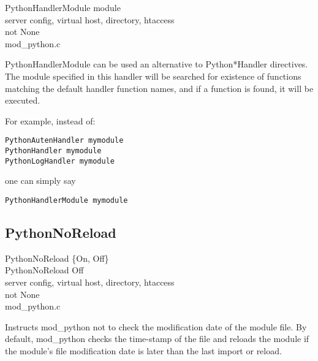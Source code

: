 PythonHandlerModule module \\
server config, virtual host, directory, htaccess\\
not None\\
mod_python.c

PythonHandlerModule can be used an alternative to Python*Handler
directives. The module specified in this handler will be searched for
existence of functions matching the default handler function names,
and if a function is found, it will be executed.

For example, instead of:
\begin{verbatim}
PythonAutenHandler mymodule
PythonHandler mymodule
PythonLogHandler mymodule
\end{verbatim}    

one can simply say
\begin{verbatim}
PythonHandlerModule mymodule
\end{verbatim}    

\subsection{PythonNoReload\label{dir-other-pnr}}

PythonNoReload \{On, Off\} \\
PythonNoReload Off\\
server config, virtual host, directory, htaccess\\
not None\\
mod_python.c

Instructs mod_python not to check the modification date of the module
file. By default, mod_python checks the time-stamp of the file and
reloads the module if the module's file modification date is later
than the last import or reload.

